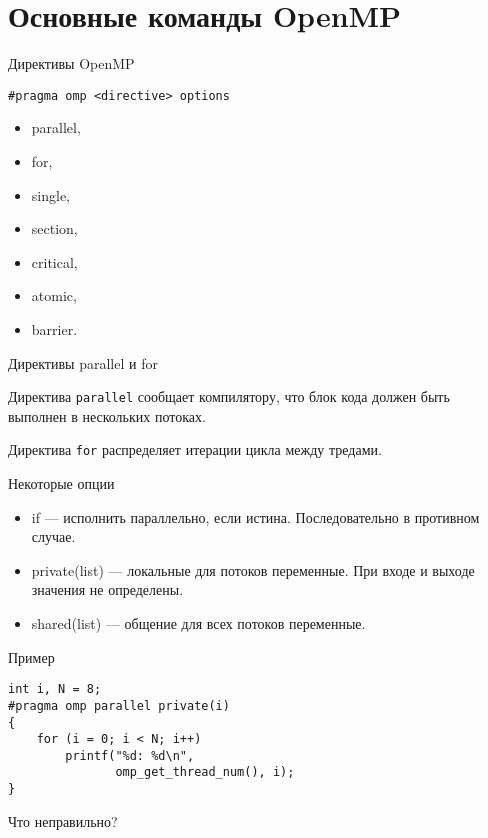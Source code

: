 \section{Основные команды OpenMP}

\begin{frame}[fragile]{Директивы OpenMP}

\begin{lstlisting}
#pragma omp <directive> options
\end{lstlisting}

\begin{itemize}
    \item parallel,
    \item for,
    \item single,
    \item section,
    \item critical,
    \item atomic,
    \item barrier.
\end{itemize}

\end{frame}

\begin{frame}[fragile]{Директивы parallel и for}

Директива \texttt{parallel} сообщает компилятору, что блок кода должен быть выполнен в нескольких потоках.

Директива \texttt{for} распределяет итерации цикла между тредами.

\end{frame}

\begin{frame}{Некоторые опции}

\begin{itemize}
    \item if --- исполнить параллельно, если истина. Последовательно в противном случае.
    \item private(list) --- локальные для потоков переменные. При входе и выходе значения не определены.
    \item shared(list) --- общение для всех потоков переменные.
\end{itemize}

\end{frame}

\begin{frame}[fragile]{Пример}
\begin{lstlisting}
int i, N = 8;
#pragma omp parallel private(i)
{
    for (i = 0; i < N; i++)
        printf("%d: %d\n",
               omp_get_thread_num(), i);
}
\end{lstlisting}

\pause

Что неправильно?
\end{frame}

